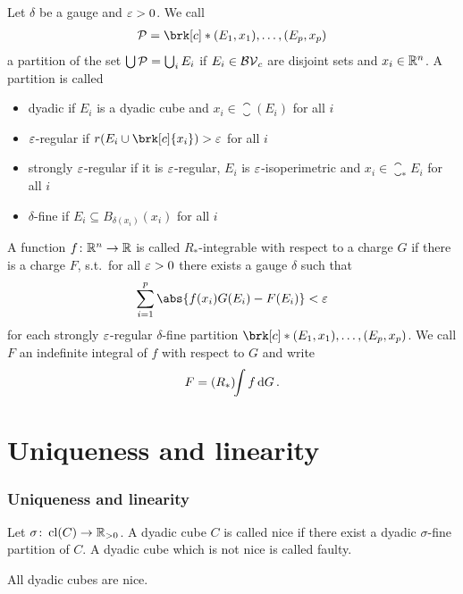 \begin{frame}
	\begin{definition}[Partitions]
	Let $\delta$ be a gauge and $\varepsilon>0$.
	We call
	\begin{align*}
		\cP=\brk[c]*{(E_1,x_1),\dots, (E_p,x_p)}
	\end{align*}
	a partition of the set $\bigcup\mathcal{P}=\bigcup_iE_i$ if $E_i\in\mathcal{BV}_c$ are disjoint sets and $x_i\in\mathbb{R}^n$. A partition is called
	\begin{itemize}
		\item dyadic if $E_i$ is a dyadic cube and $x_i\in \closure(E_i)$ for all $i$
		\item $\varepsilon$-regular if $r(E_i\cup\brk[c]{x_i})>\e$ for all $i$
		\item strongly $\varepsilon$-regular if it is $\varepsilon$-regular, $E_i$ is $\varepsilon$-isoperimetric and $x_i\in\closure_*E_i$ for all $i$
		\item $\delta$-fine if $E_i\subseteq B_{\delta(x_i)}(x_i)$ for all $i$
	\end{itemize}
	\end{definition}
\end{frame}

\begin{frame}
	\begin{definition}[$R_*$-integral]
	A function $f\colon \mathbb{R}^n\to\mathbb{R}$ is called $R_*$-integrable with respect to a charge $G$ if there is a charge $F$, s.t.\ for all $\varepsilon>0$ there exists a gauge $\delta$ such that
	\begin{align*}
		\sum_{i=1}^p\abs{f(x_i)G(E_i)-F(E_i)}<\e
	\end{align*}
	for each strongly $\varepsilon$-regular $\delta$-fine partition $\brk[c]*{(E_1,x_1),\dots,(E_p,x_p)}$. We call $F$ an indefinite integral of $f$ with respect to $G$ and write
	\begin{align*}
		F=(R_*)\!\!\int f\,\mathrm{d} G\,.
	\end{align*}
	\end{definition}
\end{frame}


\section{Uniqueness and linearity}
\begin{frame}
	\frametitle{Uniqueness and linearity}
	\begin{definition}
	Let $\sigma\colon \operatorname{cl}(C)\to\mathbb{R}_{>0}$. A dyadic cube $C$ is called nice if there exist a dyadic $\sigma$-fine partition of $C$.
	A dyadic cube which is not nice is called faulty.
	\end{definition}
	
	\begin{lemma}[Cousin]\label{le:Cousin}
	All dyadic cubes are nice.
	\end{lemma}
\end{frame}

